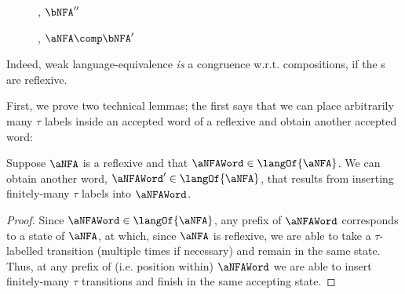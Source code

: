 \begin{figure}[ht]
    \centering
    \caption{\TNFA{}, $\bNFA''$}
    \label{fig:weakEquivTNFABPrimePrime}
\end{figure}

\begin{figure}
    \centering
    \caption{\TNFA{}, $\aNFA \comp \bNFA'$}
    \label{fig:weakEquivTNFACompABPrimePrime}
\end{figure}

Indeed, weak language-equivalence \emph{is} a congruence w.r.t. \TNFA{}
compositions, if the \TNFA{}s are reflexive.

First, we prove two technical lemmas; the first says that we can place
arbitrarily many $\tau$ labels inside an accepted word of a reflexive \TNFA{}
and obtain another accepted word:

\begin{lemma} \label{lem:padReflexiveTNFA}
    Suppose $\aNFA$ is a reflexive \TNFA{} and that $\aNFAWord \in
    \langOf{\aNFA}$. We can obtain another word, $\aNFAWord' \in
    \langOf{\aNFA}$, that results from inserting finitely-many $\tau$ labels
    into $\aNFAWord$.
\end{lemma}
\begin{proof}
    Since $\aNFAWord \in \langOf{\aNFA}$, any prefix of $\aNFAWord$
    corresponds to a state of $\aNFA$, at which, since $\aNFA$ is reflexive,
    we are able to take a $\tau$-labelled transition (multiple times if
    necessary) and remain in the same state. Thus, at any prefix of (i.e.
    position within) $\aNFAWord$ we are able to insert finitely-many $\tau$
    transitions and finish in the same accepting state.
\end{proof}

